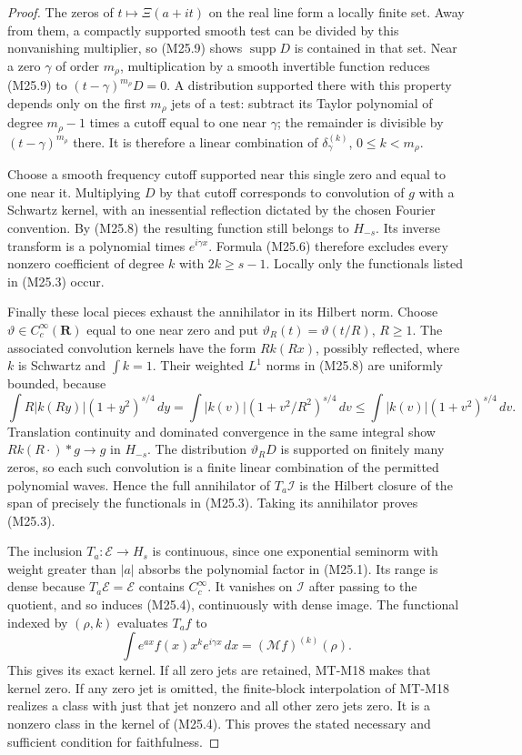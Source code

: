 \begin{proof}
The zeros of $t\mapsto\Xi(a+it)$ on the real line form a
locally finite set. Away from them, a compactly supported
smooth test can be divided by this nonvanishing multiplier,
so (M25.9) shows $\operatorname{supp}D$ is contained in that
set. Near a zero $\gamma$ of order $m_\rho$, multiplication
by a smooth invertible function reduces (M25.9) to
$(t-\gamma)^{m_\rho}D=0$. A distribution supported there
with this property depends only on the first $m_\rho$ jets
of a test: subtract its Taylor polynomial of degree
$m_\rho-1$ times a cutoff equal to one near $\gamma$;
the remainder is divisible by $(t-\gamma)^{m_\rho}$ there.
It is therefore a linear combination of
$\delta_\gamma^{(k)}$, $0\le k<m_\rho$.

Choose a smooth frequency cutoff supported near this single
zero and equal to one near it. Multiplying $D$ by that
cutoff corresponds to convolution of $g$ with a Schwartz
kernel, with an inessential reflection dictated by the
chosen Fourier convention. By (M25.8) the resulting
function still belongs to $H_{-s}$. Its inverse transform
is a polynomial times $e^{i\gamma x}$. Formula (M25.6)
therefore excludes every nonzero coefficient of degree
$k$ with $2k\ge s-1$. Locally only the functionals listed
in (M25.3) occur.

Finally these local pieces exhaust the annihilator in its
Hilbert norm. Choose $\vartheta\in C_c^\infty(\mathbf R)$
equal to one near zero and put
$\vartheta_R(t)=\vartheta(t/R)$, $R\ge1$.
The associated convolution kernels have the form
$Rk(Rx)$, possibly reflected, where $k$ is Schwartz and
$\int k=1$. Their weighted $L^1$ norms in (M25.8) are
uniformly bounded, because
\[
 \int R|k(Ry)|(1+y^2)^{s/4}\,dy
       =\int|k(v)|(1+v^2/R^2)^{s/4}\,dv
       \le\int|k(v)|(1+v^2)^{s/4}\,dv.
\]
Translation continuity and dominated convergence in the
same integral show $Rk(R\cdot)*g\to g$ in $H_{-s}$.
The distribution $\vartheta_RD$ is supported on finitely
many zeros, so each such convolution is a finite linear
combination of the permitted polynomial waves. Hence
the full annihilator of $T_a\mathcal I$ is the Hilbert
closure of the span of precisely the functionals in
(M25.3). Taking its annihilator proves (M25.3).

The inclusion $T_a:\mathcal E\to H_s$ is continuous,
since one exponential seminorm with weight greater than
$|a|$ absorbs the polynomial factor in (M25.1). Its range
is dense because $T_a\mathcal E=\mathcal E$ contains
$C_c^\infty$. It vanishes on $\mathcal I$ after passing
to the quotient, and so induces (M25.4), continuously
with dense image. The functional indexed by $(\rho,k)$
evaluates $T_af$ to
\[
       \int e^{ax}f(x)x^ke^{i\gamma x}\,dx
                    =(\mathcal Mf)^{(k)}(\rho).
\]
This gives its exact kernel. If all zero jets are retained,
MT-M18 makes that kernel zero. If any zero jet is omitted,
the finite-block interpolation of MT-M18 realizes a class
with just that jet nonzero and all other zero jets zero.
It is a nonzero class in the kernel of (M25.4). This proves
the stated necessary and sufficient condition for faithfulness.
\end{proof}

